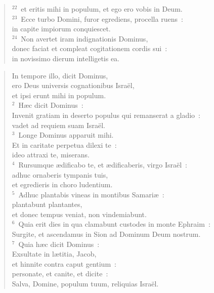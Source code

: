 \begin{flushleft}
\begin{verse}
${}^{22}$~et eritis mihi in populum, et ego ero vobis in Deum.\\
${}^{23}$~Ecce turbo Domini, furor egrediens, procella ruens~:\\ in capite impiorum conquiescet.\\
${}^{24}$~Non avertet iram indignationis Dominus,\\ donec faciat et compleat cogitationem cordis sui~:\\ in novissimo dierum intelligetis ea.\end{verse}\end{flushleft}


\begin{flushleft}\begin{verse}\vspace{-19pt}\hspace{6pt}In tempore illo, dicit Dominus,\\\hspace{6pt} ero Deus universis cognationibus Isra\"el,\\ et ipsi erunt mihi in populum.\\
${}^{2}$~H\ae c dicit Dominus~:\\ Invenit gratiam in deserto populus qui remanserat a gladio~:\\ vadet ad requiem suam Isra\"el.\\
${}^{3}$~Longe Dominus apparuit mihi.\\ Et in caritate perpetua dilexi te~:\\ ideo attraxi te, miserans.\\
${}^{4}$~Rursumque \ae dificabo te, et \ae dificaberis, virgo Isra\"el~:\\ adhuc ornaberis tympanis tuis,\\ et egredieris in choro ludentium.\\
${}^{5}$~Adhuc plantabis vineas in montibus Samari\ae~:\\ plantabunt plantantes,\\ et donec tempus veniat, non vindemiabunt.\\
${}^{6}$~Quia erit dies in qua clamabunt custodes in monte Ephraim~:\\ Surgite, et ascendamus in Sion ad Dominum Deum nostrum.\\
${}^{7}$~Quia h\ae c dicit Dominus~:\\ Exsultate in l\ae titia, Jacob,\\ et hinnite contra caput gentium~:\\ personate, et canite, et dicite~:\\ Salva, Domine, populum tuum, reliquias Isra\"el.\\

\end{verse}
\end{flushleft}
